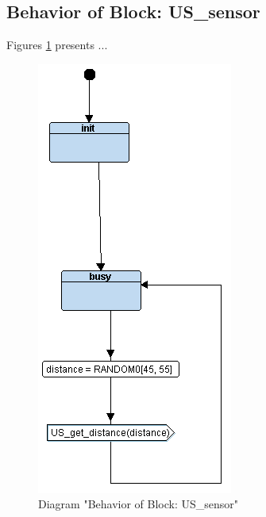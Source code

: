 \subsection{Behavior of Block: US\_sensor}
Figures \ref{fig:USsensorUSsensor03} presents ...
\begin{figure}[htb]
\centering
\includegraphics[width=\textwidth]{img_0_3.png}
\caption{Diagram "Behavior of Block: US\_sensor"}
\label{fig:USsensorUSsensor03}
\end{figure}

